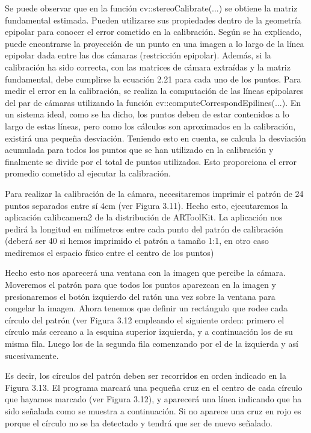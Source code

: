 Se puede observar que en la función cv::stereoCalibrate(...) se obtiene la matriz fundamental estimada. Pueden utilizarse sus propiedades dentro de la geometría epipolar para conocer el error cometido en la calibración.
Según se ha explicado, puede encontrarse la proyección de un punto en una imagen a
lo largo de la línea epipolar dada entre las dos cámaras (restricción epipolar). Además, si la
calibración ha sido correcta, con las matrices de cámara extraídas y la matriz fundamental,
debe cumplirse la ecuación 2.21 para cada uno de los puntos.
Para medir el error en la calibración, se realiza la computación de las líneas epipolares
del par de cámaras utilizando la función cv::computeCorrespondEpilines(...). En un sistema
ideal, como se ha dicho, los puntos deben de estar contenidos a lo largo de estas líneas,
pero como los cálculos son aproximados en la calibración, existirá una pequeña desviación.
Teniendo esto en cuenta, se calcula la desviación acumulada para todos los puntos que se
han utilizado en la calibración y finalmente se divide por el total de puntos utilizados. Esto
proporciona el error promedio cometido al ejecutar la calibración.

Para realizar la calibración de la cámara, necesitaremos imprimir el patrón de 24 puntos separados entre sí 4cm (ver
Figura 3.11). Hecho esto, ejecutaremos la aplicación calibcamera2 de
la distribución de ARToolKit. La aplicación nos pedirá la longitud en
milímetros entre cada punto del patrón de calibración (deberá ser 40
si hemos imprimido el patrón a tamaño 1:1, en otro caso mediremos
el espacio físico entre el centro de los puntos)

Hecho esto nos aparecerá una ventana con la imagen que percibe la cámara. Moveremos el patrón para que todos los puntos aparezcan en
la imagen y presionaremos el botón izquierdo del ratón una vez sobre la ventana para congelar la imagen. Ahora tenemos que definir un rectángulo que rodee cada círculo del patrón (ver Figura 3.12 empleando el siguiente orden: primero el círculo más cercano a la esquina superior izquierda, y a continuación los de su misma fila. Luego los de la segunda fila comenzando por el de la izquierda y así sucesivamente.

Es decir, los círculos del patrón deben ser recorridos en orden indicado en la Figura 3.13.
El programa marcará una pequeña cruz en el centro de cada círculo que hayamos marcado (ver Figura 3.12), y aparecerá una línea indicando que ha sido señalada como se muestra a continuación. Si no aparece una cruz en rojo es porque el círculo no se ha detectado y tendrá que ser de nuevo señalado.

